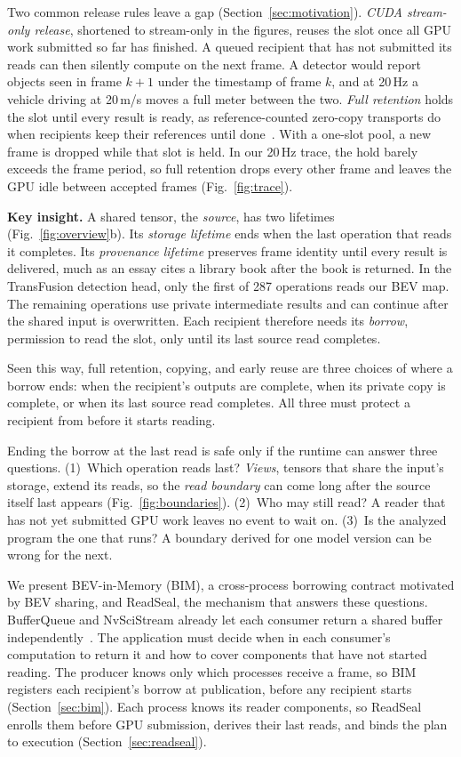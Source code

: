 \documentclass[conference]{IEEEtran}
\newcommand{\Hz}{\,Hz}
\begin{document}
Two common release rules leave a gap (Section~\ref{sec:motivation}). \emph{CUDA stream-only release}, shortened to stream-only in the figures, reuses the slot once all GPU work submitted so far has finished. A queued recipient that has not submitted its reads can then silently compute on the next frame. A detector would report objects seen in frame $k{+}1$ under the timestamp of frame $k$, and at 20\Hz{} a vehicle driving at 20\,m/s moves a full meter between the two. \emph{Full retention} holds the slot until every result is ready, as reference-counted zero-copy transports do when recipients keep their references until done~\cite{iceoryx,agnocast}. With a one-slot pool, a new frame is dropped while that slot is held. In our 20\Hz{} trace, the hold barely exceeds the frame period, so full retention drops every other frame and leaves the GPU idle between accepted frames (Fig.~\ref{fig:trace}).

\textbf{Key insight.} A shared tensor, the \emph{source}, has two lifetimes (Fig.~\ref{fig:overview}b). Its \emph{storage lifetime} ends when the last operation that reads it completes. Its \emph{provenance lifetime} preserves frame identity until every result is delivered, much as an essay cites a library book after the book is returned. In the TransFusion detection head, only the first of 287 operations reads our BEV map. The remaining operations use private intermediate results and can continue after the shared input is overwritten. Each recipient therefore needs its \emph{borrow}, permission to read the slot, only until its last source read completes.

Seen this way, full retention, copying, and early reuse are three choices of where a borrow ends: when the recipient's outputs are complete, when its private copy is complete, or when its last source read completes. All three must protect a recipient from before it starts reading.

Ending the borrow at the last read is safe only if the runtime can answer three questions. (1)~Which operation reads last? \emph{Views}, tensors that share the input's storage, extend its reads, so the \emph{read boundary} can come long after the source itself last appears (Fig.~\ref{fig:boundaries}). (2)~Who may still read? A reader that has not yet submitted GPU work leaves no event to wait on. (3)~Is the analyzed program the one that runs? A boundary derived for one model version can be wrong for the next.

We present BEV-in-Memory (BIM), a cross-process borrowing contract motivated by BEV sharing, and ReadSeal, the mechanism that answers these questions. BufferQueue and NvSciStream already let each consumer return a shared buffer independently~\cite{bufferqueue,nvscistream}. The application must decide when in each consumer's computation to return it and how to cover components that have not started reading. The producer knows only which processes receive a frame, so BIM registers each recipient's borrow at publication, before any recipient starts (Section~\ref{sec:bim}). Each process knows its reader components, so ReadSeal enrolls them before GPU submission, derives their last reads, and binds the plan to execution (Section~\ref{sec:readseal}).
\end{document}
